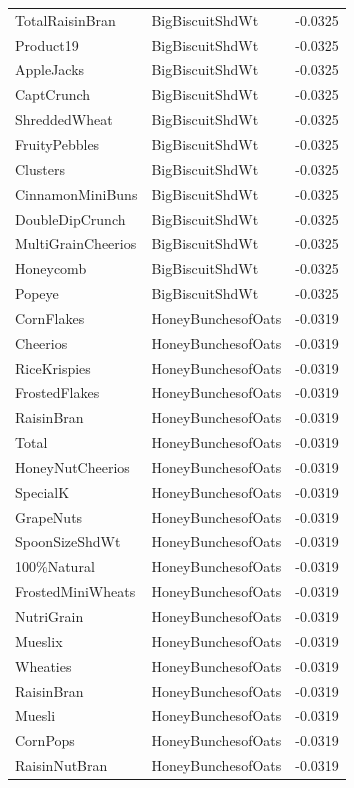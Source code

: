 \begin{table}[!htbp]
\begin{tabular}{lll}
\\
TotalRaisinBran & BigBiscuitShdWt & -0.0325
\\
Product19 & BigBiscuitShdWt & -0.0325
\\
AppleJacks & BigBiscuitShdWt & -0.0325
\\
CaptCrunch & BigBiscuitShdWt & -0.0325
\\
ShreddedWheat & BigBiscuitShdWt & -0.0325
\\
FruityPebbles & BigBiscuitShdWt & -0.0325
\\
Clusters & BigBiscuitShdWt & -0.0325
\\
CinnamonMiniBuns & BigBiscuitShdWt & -0.0325
\\
DoubleDipCrunch & BigBiscuitShdWt & -0.0325
\\
MultiGrainCheerios & BigBiscuitShdWt & -0.0325
\\
Honeycomb & BigBiscuitShdWt & -0.0325
\\
Popeye & BigBiscuitShdWt & -0.0325
\\
CornFlakes & HoneyBunchesofOats & -0.0319
\\
Cheerios & HoneyBunchesofOats & -0.0319
\\
RiceKrispies & HoneyBunchesofOats & -0.0319
\\
FrostedFlakes & HoneyBunchesofOats & -0.0319
\\
RaisinBran & HoneyBunchesofOats & -0.0319
\\
Total & HoneyBunchesofOats & -0.0319
\\
HoneyNutCheerios & HoneyBunchesofOats & -0.0319
\\
SpecialK & HoneyBunchesofOats & -0.0319
\\
GrapeNuts & HoneyBunchesofOats & -0.0319
\\
SpoonSizeShdWt & HoneyBunchesofOats & -0.0319
\\
100\%Natural & HoneyBunchesofOats & -0.0319
\\
FrostedMiniWheats & HoneyBunchesofOats & -0.0319
\\
NutriGrain & HoneyBunchesofOats & -0.0319
\\
Mueslix & HoneyBunchesofOats & -0.0319
\\
Wheaties & HoneyBunchesofOats & -0.0319
\\
RaisinBran & HoneyBunchesofOats & -0.0319
\\
Muesli & HoneyBunchesofOats & -0.0319
\\
CornPops & HoneyBunchesofOats & -0.0319
\\
RaisinNutBran & HoneyBunchesofOats & -0.0319

\end{tabular}
\end{table}

